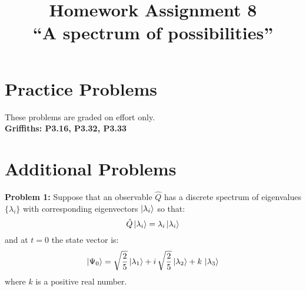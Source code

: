 \documentclass[12pt]{article}
\begin{document}
\newcommand{\ihbar}{\ensuremath{i \hbar}}
\newcommand{\dPsidt}{\ensuremath{ \frac{\partial \Psi}{\partial t} }}
\newcommand{\dPsidx}{\ensuremath{ \frac{\partial \Psi}{\partial x} }}
\newcommand{\ddPsidx}{\ensuremath{ \frac{\partial^2 \Psi}{\partial x^2} }}
\newcommand{\dPssdt}{\ensuremath{ \frac{\partial \Psi^*}{\partial t} }}
\newcommand{\dPssdx}{\ensuremath{ \frac{\partial \Psi^*}{\partial x} }}
\newcommand{\ddPssdx}{\ensuremath{ \frac{\partial^2 \Psi^*}{\partial x^2} }}

\newcommand{\dphidt}{\ensuremath{ \frac{d \phi}{dt} }}
\newcommand{\dpsidx}{\ensuremath{ \frac{d \psi}{dx} }}
\newcommand{\ddpsidx}{\ensuremath{ \frac{d^2 \psi}{dx^2} }}


\date{\vspace{-5ex}}

\title{Homework Assignment 8 \\ ``A spectrum of possibilities''}

\maketitle

\section*{Practice Problems}

These problems are graded on effort only.\\

\noindent
{\bf Griffiths: P3.16, P3.32, P3.33} \\
  
\section*{Additional Problems}

\noindent
{\bf Problem 1:}  Suppose that an observable $\hat{Q}$ has a discrete spectrum of eigenvalues 
$\{ \lambda_i \}$ with corresponding eigenvectors $\ket{\lambda_i}$ so that:
$$\hat{Q} \ket{\lambda_i} = \lambda_i \ket{\lambda_i}$$
and at $t=0$ the state vector is:
$$\ket{\Psi_0} = \sqrt{\frac{2}{5}}\ket{\lambda_1} + i\,\sqrt{\frac{2}{5}}\ket{\lambda_2} + k\,\ket{\lambda_3}$$
where $k$ is a positive real number.\\
\end{document}
